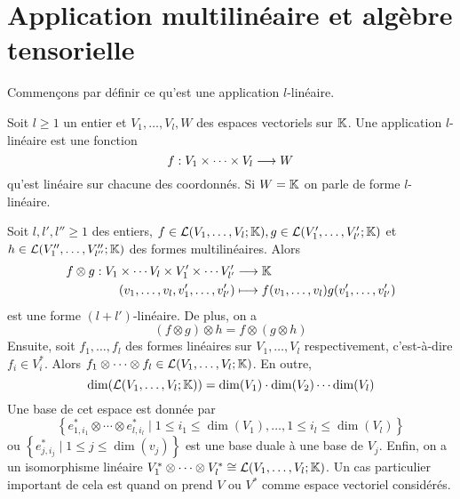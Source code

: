 \chapter{Application multilinéaire et algèbre tensorielle}
Commençons par définir ce qu'est une application $l$-linéaire.
\begin{definition}
  Soit $l\geq 1$ un entier et $V_1, \dots, V_l, W$ des espaces vectoriels sur $\mathbb{K}$.  Une application $l$-linéaire est une fonction $$f: V_1 \times \cdots \times V_l \longrightarrow W$$
  qu'est linéaire sur chacune des coordonnés. Si $W = \mathbb{K}$ on parle de forme $l$-linéaire.
\end{definition}

Soit $l, l', l'' \geq 1$ des entiers, $f\in \mathcal{L}(V_1, \dots, V_l; \mathbb{K}), g\in \mathcal{L}(V_1', \dots, V_{l'}'; \mathbb{K})$ et $h\in \mathcal{L}(V_1'', \dots, V_{l''}''; \mathbb{K})$ des formes multilinéaires. Alors
\begin{align*}
  f\otimes g: V_1\times \cdots V_l\times V_1'\times \cdots V_{l'}' &\longrightarrow \mathbb{K} \\
  (v_1, \dots, v_l, v_1', \dots, v_{l'}')&\longmapsto f(v_1,\dots,v_l)g(v_1', \dots, v_{l'}')
\end{align*}
est une forme $(l+l')$-linéaire. De plus, on a 
$$(f\otimes g)\otimes h = f \otimes (g \otimes h)$$
Ensuite, soit  $f_1, \dots, f_l$ des formes linéaires sur $V_1, \dots, V_l$ respectivement, c'est-à-dire $f_i \in V_i^*$. Alors $f_1 \otimes \cdots \otimes f_l \in \mathcal{L}(V_1, \dots, V_l; \mathbb{K})$. En outre,
$$\dim(\mathcal{L}(V_1, \dots, V_l; \mathbb{K})) = \dim(V_1)\cdot\dim(V_2)\cdots \dim(V_l)$$
Une base de cet espace est donnée par
$$\left\{ e_{1,i_1}^* \otimes \cdots \otimes e^*_{l, i_l}  \mid 1 \leq i_1 \leq \dim(V_1), \dots, 1 \leq i_l \leq \dim(V_l)\right\}$$
ou $\left\{ e^*_{j, i_j} \mid 1 \leq j \leq \dim(v_j) \right\}$ est une base duale à une base de $V_j$. Enfin, on a un isomorphisme linéaire $V_1^*\otimes \cdots \otimes V_l^* \cong \mathcal{L}(V_1, \dots, V_l; \mathbb{K})$. Un cas particulier important de cela est quand on prend $V$ ou $V^*$ comme espace vectoriel considérés.

